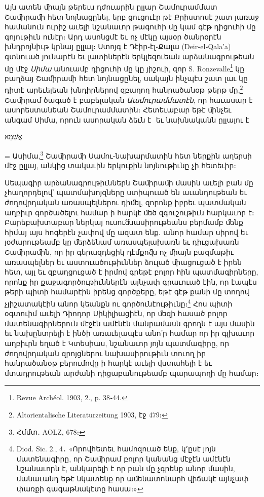 \documentclass{article}
\newcommand*\svgAAAA{}
\begin{document}
{Այն ատեն ﬕայն թերեւս դժուարին ըլլար Շամուրամմատ Շաﬕրաﬕ հետ նոյնացընել, երբ ցուցուէր թէ Քրիստոսէ շատ յառաջ համանուն ուրիշ աւելի նշանաւոր թագուհի մը կամ գէթ դիցուհի մը գոյութիւն ունէր։ Արդ ասոնցմէ եւ ոչ մէկը այսօր ծանրօրէն խնդրոյնիւթ կրնայ ըլլալ։ Ստոյգ է Դէիր֊էլ֊Քալա (Deir֊el֊Qala'a) գտնուած յունարէն եւ լատիներէն երկլեզուեան արձանագրութեան մը մէջ \emph{Սիմա} անուամբ դիցուհի մը կը յիշուի, զոր S. Ronzevalle\footnote{Revue Archéol. 1903, 2., p. 38֊44.} կը բաղձայ Շաﬕրաﬕ հետ նոյնացընել, սակայն ինչպէս շատ լաւ կը դիտէ արեւելեան խնդիրներով զբաղող հանրածանօթ թերթ մը,\footnote{Altorientalische Literaturzeitung 1903, էջ 479։} Շաﬕրամ ծագած է բաբելական \emph{Աամուրամմատէն}, որ հաւասար է ասորեստանեան Շամուրամմատին։ Հետեւաբար եթէ ﬕնչեւ անգամ Սիմա, որուն ասորական ձեւն է $\svgAAAA$ եւ նախնականն ըլլալու է \begin{hebrewfont}אֲשִׁמַא\end{hebrewfont} = Ասիմա,\footnote{Հմմտ․ AOLZ, 678։} Շաﬕրաﬕ Սամու֊նախարմատին հետ ներքին աղերսի մէջ ըլլայ, անկից տակաւին երկուքին նոյնութիւնը չի հետեւիր։

Սեպագիր արձանագրութիւններն Շաﬕրաﬕ մասին աւելի բան մը չհաղորդելով՝ պատմախոյզները ստիպուած են աւանդութեան եւ ժողովրդական առասպելներու դիﬔլ, զորոնք իբրեւ պատմական աղբիւր գործածելու համար ի հարկէ ﬔծ զգուշութիւն հարկաւոր է։ Բարեբախտաբար ներկայ ուսուﬓասիրութեանս բերմամբ ﬔնք հիմայ այս հոգերէն չափով մը ազատ ենք․ անոր համար սիրով եւ յօժարութեամբ կը ﬔրձենամ առասպելախառն եւ դիւցախառն Շաﬕրաﬕն, որ իր գերազդեցիկ դէմքոﬖ ոչ ﬕայն բազմաթիւ առասպելներ եւ աստուածութիւններ ձուլած ﬕացուցած է իրեն հետ, այլ եւ զբաղցուցած է իրմով գրեթէ բոլոր հին պատմագիրները, որոնք իր քաջագործութիւններէն այնչափ գրաւուած էին, որ էապէս թերի պիտի համարէին իրենց գործքերը, եթէ գէթ քանի մը տողով չյիշատակէին անոր կեանքն ու գործունէութիւնը։\footnote{Diod. Sic. 2., 4․ «Որովհետեւ համոզուած ենք, կ՚ըսէ յոյն մատենագիրը, որ Շաﬕրամ բոլոր կանանց մէջէն ամէնէն նշանաւորն է, անկարելի է որ բան մը չգրենք անոր մասին, մանաւանդ եթէ նկատենք որ աﬔնատոնարհ վիճակէ այնչափ փառքի գագաթնակէտը հասա։»} Հոս պիտի օգտուիմ աւելի Դիոդոր Սիկիլիացիէն, որ ﬔզի հասած բոլոր մատենագիրներուն մէջէն ամէնէն մանրամասն գրողն է այս մասին եւ նախընտրելի է ինծի առաւելապէս անո՛ր համար որ իր գլխաւոր աղբիւրն եղած է Կտեսիաս, նշանաւոր յոյն պատմագիրը, որ ժողովրդական զրոյցներու նախասիրութիւն տուող իր հանրածանօթ բերումովը ի հարկէ աւելի վստահելի է եւ մտադրութեան արժանի դիցաբանութեամբ պարապողի մը համար։

}
\end{document}
